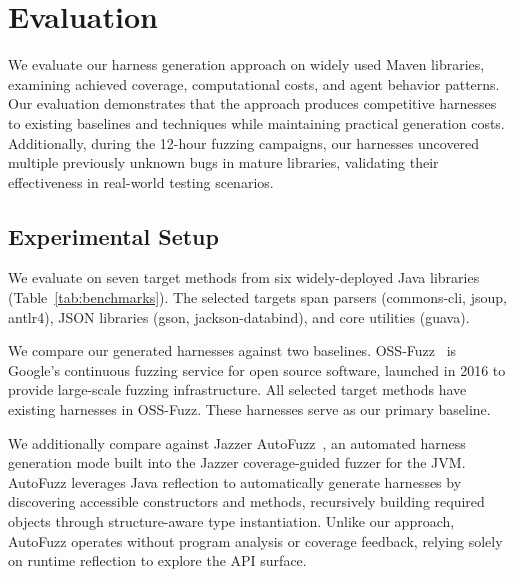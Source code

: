 \section{Evaluation}%
\label{sec:evaluation}

We evaluate our harness generation approach on widely used Maven libraries, examining achieved coverage, computational costs, and agent behavior patterns. Our evaluation demonstrates that the approach produces competitive harnesses to existing baselines and techniques while maintaining practical generation costs. Additionally, during the 12-hour fuzzing campaigns, our harnesses uncovered multiple previously unknown bugs in mature libraries, validating their effectiveness in real-world testing scenarios.

\subsection{Experimental Setup}%
\label{subsec:exp-setup}

We evaluate on seven target methods from six widely-deployed Java libraries (Table~\ref{tab:benchmarks}). The selected targets span parsers (commons-cli, jsoup, antlr4), JSON libraries (gson, jackson-databind), and core utilities (guava).

We compare our generated harnesses against two baselines. OSS-Fuzz~\cite{CITE:OSSFuzz} is Google's continuous fuzzing service for open source software, launched in 2016 to provide large-scale fuzzing infrastructure. All selected target methods have existing harnesses in OSS-Fuzz. These harnesses serve as our primary baseline.

We additionally compare against Jazzer AutoFuzz~\cite{CITE:Jazzer}, an automated harness generation mode built into the Jazzer coverage-guided fuzzer for the JVM. AutoFuzz leverages Java reflection to automatically generate harnesses by discovering accessible constructors and methods, recursively building required objects through structure-aware type instantiation. Unlike our approach, AutoFuzz operates without program analysis or coverage feedback, relying solely on runtime reflection to explore the API surface.

